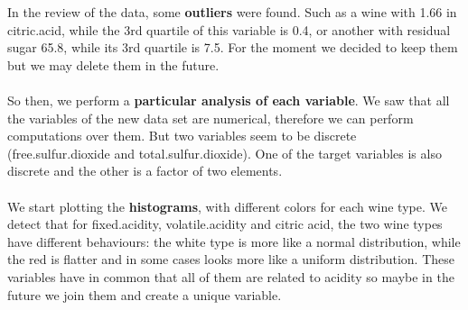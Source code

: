 \documentclass[10pt]{article}
\begin{document}
In the review of the data, some \textbf{outliers} were found. Such as a wine with 1.66 in citric.acid, while the 3rd quartile of this variable is 0.4, or another with residual sugar 65.8, while its 3rd quartile is 7.5. For the moment we decided to keep them but we may delete them in the future. \\ \ \\
So then, we perform a \textbf{particular analysis of each variable}. We saw that all the variables of the new data set are numerical, therefore we can perform computations over them. But two variables seem to be discrete (free.sulfur.dioxide and total.sulfur.dioxide). One of the target variables is also discrete and the other is a factor of two elements. \\ \ \\
We start plotting the \textbf{histograms}, with different colors for each wine type. We detect that for fixed.acidity, volatile.acidity and citric acid, the two wine types have different behaviours: the white type is more like a normal distribution, while the red is flatter and in some cases looks more like a uniform distribution. These variables have in common that all of them are related to acidity so maybe in the future we join them and create a unique variable. \\
\end{document}
